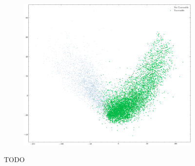 \documentclass[../document.tex]{subfiles}
\begin{document}
\begin{figure}[H]
\begin{subfigure}[b]{0.48\textwidth}
    \end{subfigure}
    \begin{subfigure}[b]{0.48\textwidth}
        \includegraphics[width=\linewidth]{../img/5/pca/pca-1.png}
    \end{subfigure}
\caption{TODO}
\end{figure}
\end{document}
